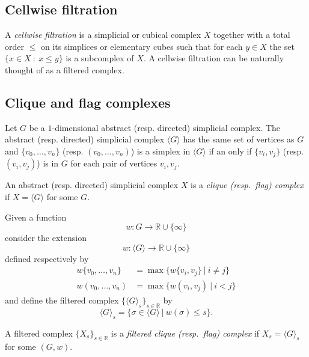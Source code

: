 \documentclass{amsart}
\begin{document}
	\subsection*{Cellwise filtration} \label{cellwise_filtration}
	
	A \textit{cellwise filtration} is a simplicial or cubical complex $X$ together with a total order $\leq$ on its simplices or elementary cubes such that for each $y \in X$ the set $\{x \in X\ :\ x \leq y\}$ is a subcomplex of $X$. A cellwise filtration can be naturally thought of as a 
	filtered complex.
	
	\subsection*{Clique and flag complexes} \label{clique_and_flag_complexes}
	
	Let $G$ be a $1$-dimensional abstract (resp. directed) simplicial complex. The abstract (resp. directed) simplicial complex $\langle G \rangle$ has the same set of vertices as $G$ and $\{v_0, \dots, v_n\}$ \big(resp. $(v_0, \dots, v_n)$\big) is a simplex in $\langle G \rangle$ if an only if $\{v_i, v_j\}$ \big(resp. $(v_i, v_j)$\big) is in $G$ for each pair of vertices $v_i, v_j$. 
	
	An abstract (resp. directed) simplicial complex $X$ is a \textit{clique (resp.\ flag) complex} if $X = \langle G \rangle$ for some $G$.
	
	Given a function
	\begin{equation*}
	w : G \to \mathbb R \cup \{\infty\}
	\end{equation*}
	consider the extension
	\begin{equation*}
	w : \langle G \rangle \to \mathbb R \cup \{\infty\}
	\end{equation*}
	defined respectively by 
	\begin{align*}
	w\{v_0, \dots, v_n\} & = \max\{ w\{v_i, v_j\}\ |\ i \neq j\} \\
	w(v_0, \dots, v_n) & = \max\{ w(v_i, v_j)\ |\ i < j\}
	\end{align*}
	and define the %
	filtered complex $\{\langle G \rangle_{s}\}_{s \in \mathbb R}$ by
	\begin{equation*}
	\langle G \rangle_s = \{\sigma \in \langle G \rangle\ |\ w(\sigma) \leq s\}.
	\end{equation*}
	
	A filtered complex $\{X_s\}_{s \in \mathbb R}$ is a \textit{filtered clique (resp.\ flag) complex} if $X_s = \langle G \rangle_s$ for some $(G,w)$.
	
\end{document}
